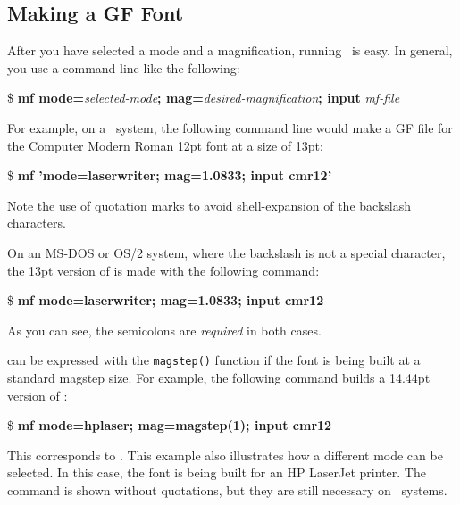 \subsection{Making a GF Font}
\label{sec:buildfont}

After you 
have selected a mode and a magnification, running \MF\ is
easy.  In general, you use a command line like the following:

\begin{ttindent}
\$ \textbf{mf {\bs}mode=}\textit{selected-mode}\textbf{; mag=}\textit{desired-magnification}\textbf{; {\bs}input} \textit{mf-file}
\end{ttindent}

For example, on a \Unix\ system, the following command line would make
a GF file for the Computer Modern Roman 12pt font at a size of 13pt:

\begin{ttindent}
\$ \textbf{mf '{\bs}mode=laserwriter; mag=1.0833; {\bs}input cmr12'}
\end{ttindent}

Note the use of quotation marks to avoid shell-expansion of the backslash
characters.

On an MS-DOS or OS/2 system, where the backslash is not a special
character, the 13pt version of  is made with the following
command:

\begin{ttindent}
\$ \textbf{mf {\bs}mode=laserwriter; mag=1.0833; {\bs}input cmr12}
\end{ttindent}

As you can see, the semicolons are {\em required\/} in both cases.

 can 
be expressed with the \verb|magstep()| function
if the font is being built at a standard magstep size.  For example,
the following command builds a 14.44pt version of :

\begin{ttindent}
  \$ \textbf{mf {\bs}mode=hplaser; mag=magstep(1); {\bs}input cmr12}
\end{ttindent}

This corresponds to .  This example also illustrates
how a different mode can be selected. In this case, the font is being
built for an HP LaserJet printer.  The command is shown without quotations,
but they are still necessary on \Unix\ systems.


